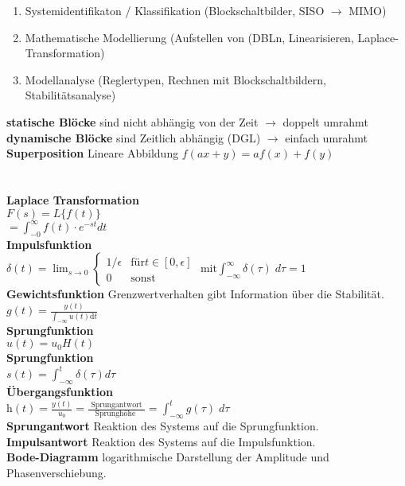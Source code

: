 \documentclass{article}
\begin{document}
\begin{multicols}{6}
	\begin{enumerate}[leftmargin=4mm]
			\item Systemidentifikaton / Klassifikation (Blockschaltbilder, SISO $\rightarrow$ MIMO)
			\item Mathematische Modellierung (Aufstellen von (DBLn, Linearisieren, Laplace-Transformation)
			\item Modellanalyse (Reglertypen, Rechnen mit Blockschaltbildern, Stabilitätsanalyse)
	\end{enumerate}
\textbf{statische Blöcke} sind nicht abhängig von der Zeit $\rightarrow$ doppelt umrahmt
\\
\textbf{dynamische Blöcke} sind Zeitlich abhängig (DGL) $\rightarrow$ einfach umrahmt
\\
\textbf{Superposition} Lineare Abbildung $f(a x+y)=a f(x)+f(y)$
\\\\\\
\textbf{Laplace Transformation}\\ $F(s)=L\{f(t)\}$\\$=\int_{-0}^{\infty} f(t) \cdot e^{-s t} d t$
\\
\textbf{Impulsfunktion\\} $\delta(t) = \lim_{s \rightarrow 0}
	\begin{cases}
		1/\epsilon	&\text{für} t \in [0,\epsilon] \\
		0	&\text{sonst}
	\end{cases}$
	$\text{mit} \int_{-\infty}^{\infty} \delta(\tau)\; d\tau = 1$
\\
\textbf{Gewichtsfunktion} Grenzwertverhalten gibt Information über die Stabilität. $g(t)=\frac{y(t)}{\int_{-\infty} u(t) \mathrm{d} t}$
\\
\textbf{Sprungfunktion\\} $u(t) = u_0 H(t)$
\\
\textbf{Sprungfunktion\\} $s(t)=\int_{-\infty}^{t} \delta(\tau) d \tau$
\\
\textbf{Übergangsfunktion\\}  $\mathrm{h}(t)=\frac{y(t)}{u_{0}} = \frac{\text{ Sprungantwort }}{\text{Sprunghöhe }} = \int_{-\infty}^{t} g(\tau)\; d\tau$
\\
\textbf{Sprungantwort} Reaktion des Systems auf die Sprungfunktion.
\\
\textbf{Impulsantwort} Reaktion des Systems auf die Impulsfunktion.
\\
\textbf{Bode-Diagramm} logarithmische Darstellung der Amplitude und Phasenverschiebung.

\end{multicols}
\end{document}
